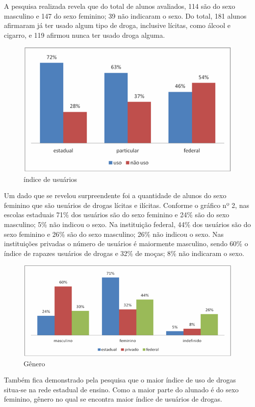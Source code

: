 \documentclass[article,12pt,onesidea,4paper,english,brazil]{abntex2}
\begin{document}
A pesquisa realizada revela que do total de alunos avaliados, 114 são do sexo masculino e 147 do sexo feminino; 39 não indicaram o sexo. Do total, 181 alunos afirmaram já ter usado algum tipo de droga, inclusive lícitas, como álcool e cigarro, e 119 afirmou nunca ter usado droga alguma.
\begin{figure}[h]
	\centering
	\includegraphics[width=0.7\linewidth]{pip-artigo13-01}
	\caption{índice de usuários}
	\label{fig:pip-artigo13-01}
\end{figure}

Um dado que se revelou surpreendente foi a quantidade de alunos do sexo feminino que são usuários de drogas lícitas e ilícitas. Conforme o gráfico nº 2, nas escolas estaduais 71\% dos usuários são do sexo feminino e 24\% são do sexo masculino; 5\% não indicou o sexo. Na instituição federal, 44\% dos usuários são do sexo feminino e 26\% são do sexo masculino; 26\% não indicou o sexo. Nas instituições privadas o número de usuários é maiormente masculino, sendo 60\% o índice de rapazes usuários de drogas e 32\% de moças; 8\% não indicaram o sexo.
\begin{figure}[h]
	\centering
	\includegraphics[width=0.7\linewidth]{pip-artigo13-02}
	\caption{Gênero}
	\label{fig:pip-artigo13-02}
\end{figure}

	Também fica demonstrado pela pesquisa que o maior índice de uso de drogas situa-se na rede estadual de ensino. Como a maior parte do alunado é do sexo feminino, gênero no qual se encontra maior índice de usuários de drogas.
	
\end{document}
